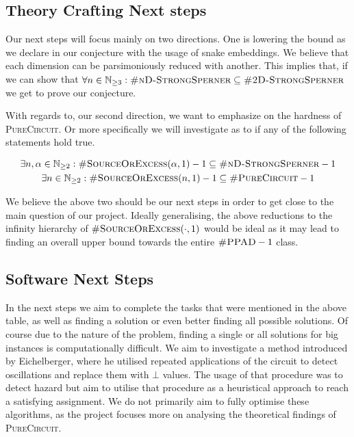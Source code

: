 
\subsection{Theory Crafting Next steps}

Our next steps will focus mainly on two directions. One is lowering the bound as we declare in our conjecture with the
usage of snake embeddings. We believe that each dimension can be parsimoniously reduced with another. This implies
that, if we can show that $\forall n \in \mathbb{N}_{\geq 3}: \textsc{\#nD-StrongSperner} \subseteq \textsc{\#2D-StrongSperner}$
we get to prove our conjecture.


With regards to, our second direction, we want to emphasize on the hardness of \textsc{PureCircuit}.
Or more specifically we will investigate as to if any of the following statements hold true.

\begin{gather*}
    \exists n, \alpha \in \mathbb{N}_{\geq 2}:
    \textsc{\#SourceOrExcess}(\alpha,1) - 1  \subseteq \textsc{\#nD-StrongSperner} -1 \\
    \exists n \in \mathbb{N}_{\geq 2}: \textsc{\#SourceOrExcess}(n,1) - 1 \subseteq \textsc{\#PureCircuit} -1 \\
\end{gather*}

We believe the above two should be our next steps in order to get close to the main question of our project.
Ideally generalising, the above reductions to the infinity hierarchy of
$\textsc{\#SourceOrExcess}(\cdot,1)$ would be ideal as it may lead to finding an overall upper bound
towards the entire $\textsc{\#PPAD} -1$ class.


\subsection{Software Next Steps}

In the next steps we aim to complete the tasks that were mentioned in the above table,
as well as finding a solution or even better finding all possible solutions. Of
course due to the nature of the problem, finding a single or all solutions for big instances
is computationally difficult. We aim to investigate a method introduced by Eichelberger, where
he utilised repeated applications of the circuit to detect oscillations and replace them with
$\bot$ values. The usage of that procedure was to detect hazard but aim to utilise that procedure
as a heuristical approach to reach a satisfying assignment. We do not primarily aim
to fully optimise these algorithms, as the project focuses more on analysing the theoretical findings
of \textsc{PureCircuit}.


